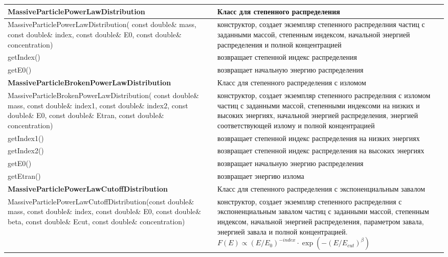 \begin{small}
	\label{MassiveParticleMethods1}
	\begin{xtabular}{|p{0.52\textwidth}|p{0.48\textwidth}|}
		\hline
		\textbf{MassiveParticlePowerLawDistribution} & Класс для степенного распределения\\
		\hline
		MassiveParticlePowerLawDistribution( const double\& mass, const double\& index, const double\& E0, const double\& concentration) & конструктор, создает экземпляр степенного распределния частиц с заданными массой, степенным индексом, начальной энергией распределения и полной концентрацией\\
		\hline
		getIndex() & возвращает степенной индекс распределения\\
		\hline
		getE0() & возвращает начальную энергию распределения\\
		\hline
		\textbf{MassiveParticleBrokenPowerLawDistribution} & Класс для степенного распределения с изломом\\
		\hline
		MassiveParticleBrokenPowerLawDistribution( const double\& mass, const double\& index1, const double\& index2, const double\& E0, const double\& Etran, const double\& concentration) & конструктор, создает экземпляр степенного распределния с изломом частиц с заданными массой, степенными индексоми на низких и высоких энергиях, начальной энергией распределения, энергией соответствующей излому и полной концентрацией\\
		\hline
		getIndex1() & возвращает степенной индекс распределения на низких энергиях\\
		\hline
		getIndex2() & возвращает степенной индекс распределения на высоких энергиях\\
		\hline
		getE0() & возвращает начальную энергию распределения\\
		\hline
		getEtran() & возвращает энергию излома\\
		\hline
		\textbf{MassiveParticlePowerLawCutoffDistribution} & Класс для степенного распределения с экспоненциальным завалом\\
		\hline
		MassiveParticlePowerLawCutoffDistribution(const double\& mass, const double\& index, const double\& E0, const double\& beta, const double\& Ecut, const double\& concentration) & конструктор, создает экземпляр степенного распределния с экспоненциальным завалом частиц с заданными массой, степенным индексом, начальной энергией распределения, параметром завала, энергией завала и полной концентрацией. $F(E)\propto (E/E_0)^{-index}\cdot\exp(-(E/E_{cut})^\beta)$\\

\end{xtabular}
\end{small}
